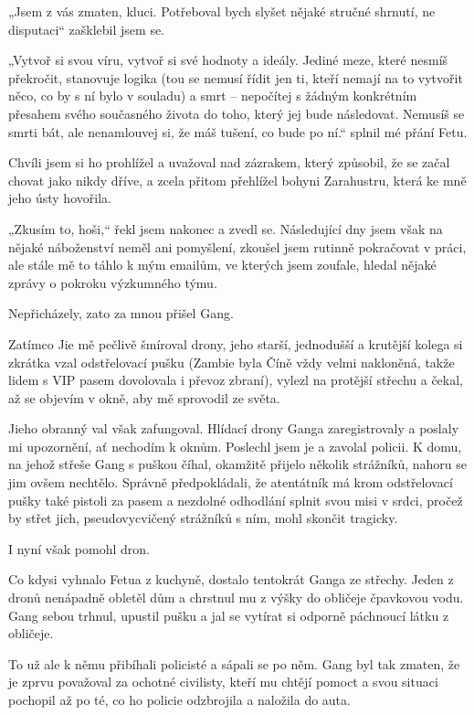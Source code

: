 „Jsem z vás zmaten, kluci. Potřeboval bych slyšet nějaké stručné shrnutí, ne disputaci“ zašklebil jsem se.

„Vytvoř si svou víru, vytvoř si své hodnoty a ideály. Jediné meze, které nesmíš překročit, stanovuje logika (tou se nemusí řídit jen ti, kteří nemají na to vytvořit něco, co by s ní bylo v souladu) a smrt – nepočítej s žádným konkrétním přesahem svého současného života do toho, který jej bude následovat. Nemusíš se smrti bát, ale nenamlouvej si, že máš tušení, co bude po ní.“ splnil mé přání Fetu.

Chvíli jsem si ho prohlížel a uvažoval nad zázrakem, který způsobil, že se začal chovat jako nikdy dříve, a zcela přitom přehlížel bohyni Zarahustru, která ke mně jeho ústy hovořila.

„Zkusím to, hoši,“ řekl jsem nakonec a zvedl se. Následující dny jsem však na nějaké náboženství neměl ani pomyšlení, zkoušel jsem rutinně pokračovat v práci, ale stále mě to táhlo k mým emailům, ve kterých jsem zoufale, hledal nějaké zprávy o pokroku výzkumného týmu.

Nepřicházely, zato za mnou přišel Gang.
\vspace{0.75cm}

Zatímco Jie mě pečlivě šmíroval drony, jeho starší, jednodušší a krutější kolega si zkrátka vzal odstřelovací pušku (Zambie byla Číně vždy velmi nakloněná, takže lidem s VIP pasem dovolovala i převoz zbraní), vylezl na protější střechu a čekal, až se objevím v okně, aby mě sprovodil ze světa.

Jieho obranný val však zafungoval. Hlídací drony Ganga zaregistrovaly a poslaly mi upozornění, ať nechodím k oknům. Poslechl jsem je a zavolal policii. K domu, na jehož střeše Gang s puškou číhal, okamžitě přijelo několik strážníků, nahoru se jim ovšem nechtělo. Správně předpokládali, že atentátník má krom odstřelovací pušky také pistoli za pasem a nezdolné odhodlání splnit svou misi v srdci, pročež by střet jich, pseudovycvičený strážníků s ním, mohl skončit tragicky. 

I nyní však pomohl dron.

Co kdysi vyhnalo Fetua z kuchyně, dostalo tentokrát Ganga ze střechy. Jeden z dronů nenápadně obletěl dům a chrstnul mu z výšky do obličeje čpavkovou vodu. Gang sebou trhnul, upustil pušku a jal se vytírat si odporně páchnoucí látku z obličeje.

To už ale k němu přibíhali policisté a sápali se po něm. Gang byl tak zmaten, že je zprvu považoval za ochotné civilisty, kteří mu chtějí pomoct a svou situaci pochopil až po té, co ho policie odzbrojila a naložila do auta. 

